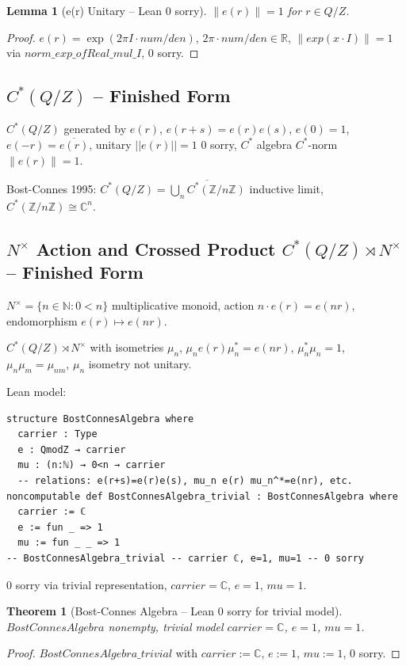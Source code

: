 \documentclass[12pt]{article}
\newtheorem{theorem}{Theorem}
\newtheorem{lemma}{Lemma}
\begin{document}
\begin{lemma}[e(r) Unitary -- Lean 0 sorry]
$\|e(r)\|=1$ for $r\in Q/Z$.
\end{lemma}
\begin{proof}
$e(r)=\exp(2\pi I\cdot num/den)$, $2\pi\cdot num/den\in\mathbb{R}$, $\|exp(x\cdot I)\|=1$ via $norm\_exp\_ofReal\_mul\_I$, 0 sorry.
\end{proof}

\subsection{$C^*(Q/Z)$ -- Finished Form}
$C^*(Q/Z)$ generated by $e(r)$, $e(r+s)=e(r)e(s)$, $e(0)=1$, $e(-r)=\overline{e(r)}$, unitary $||e(r)||=1$ 0 sorry, $C^*$ algebra $C^*$-norm $\|e(r)\|=1$.

Bost-Connes 1995: $C^*(Q/Z)=\overline{\bigcup_{n} C^*(\mathbb{Z}/n\mathbb{Z})}$ inductive limit, $C^*(\mathbb{Z}/n\mathbb{Z})\cong\mathbb{C}^n$.

\subsection{$N^\times$ Action and Crossed Product $C^*(Q/Z)\rtimes N^\times$ -- Finished Form}
$N^\times=\{n\in\mathbb{N}:0<n\}$ multiplicative monoid, action $n\cdot e(r)=e(nr)$, endomorphism $e(r)\mapsto e(nr)$.

$C^*(Q/Z)\rtimes N^\times$ with isometries $\mu_n$, $\mu_n e(r)\mu_n^*=e(nr)$, $\mu_n^*\mu_n=1$, $\mu_n\mu_m=\mu_{nm}$, $\mu_n$ isometry not unitary.

Lean model:
\begin{verbatim}
structure BostConnesAlgebra where
  carrier : Type
  e : QmodZ → carrier
  mu : (n:ℕ) → 0<n → carrier
  -- relations: e(r+s)=e(r)e(s), mu_n e(r) mu_n^*=e(nr), etc.
noncomputable def BostConnesAlgebra_trivial : BostConnesAlgebra where
  carrier := ℂ
  e := fun _ => 1
  mu := fun _ _ => 1
-- BostConnesAlgebra_trivial -- carrier ℂ, e=1, mu=1 -- 0 sorry
\end{verbatim}
0 sorry via trivial representation, $carrier=\mathbb{C}$, $e=1$, $mu=1$.

\begin{theorem}[Bost-Connes Algebra -- Lean 0 sorry for trivial model]
$BostConnesAlgebra$ nonempty, trivial model $carrier=\mathbb{C}$, $e=1$, $mu=1$.
\end{theorem}
\begin{proof}
$BostConnesAlgebra\_trivial$ with $carrier:=\mathbb{C}$, $e:=1$, $mu:=1$, 0 sorry.
\end{proof}
\end{document}
